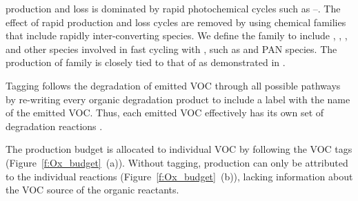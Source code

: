  production and loss is dominated by rapid photochemical cycles such as --.
The effect of rapid production and loss cycles are removed by using chemical families that include rapidly inter-converting species.
We define the  family to include , , ,  and other species involved in fast cycling with , such as  and PAN species.
The production of  family is closely tied to that of  as demonstrated in \citet{Butler:2011}.

Tagging follows the degradation of emitted VOC through all possible pathways by re-writing every organic degradation product to include a label with the name of the emitted VOC.
Thus, each emitted VOC effectively has its own set of degradation reactions \citep{Butler:2011}.

%        
%        

The  production budget is allocated to individual VOC by following the VOC tags \mbox{(Figure \ref{f:Ox_budget} (a)).}
Without tagging,  production can only be attributed to the individual reactions \mbox{(Figure \ref{f:Ox_budget} (b))}, lacking information about the VOC source of the organic reactants.

